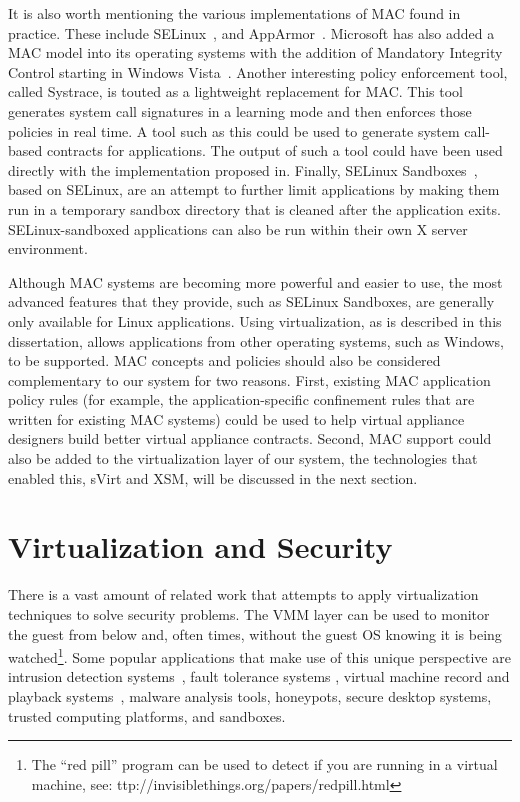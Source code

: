 It is also worth mentioning the various implementations of MAC found in practice. These include SELinux~\cite{smalley_2001, loscocco_2001}, and AppArmor~\cite{AppArmor_2006}. Microsoft has also added a MAC model into its operating systems with the addition of Mandatory Integrity Control starting in Windows Vista~\cite{windows_integrity_mechanism, mandatory_integrity_control}. Another interesting policy enforcement tool, called Systrace\cite{provos_2003}, is touted as a lightweight replacement for MAC. This tool generates system call signatures in a learning mode and then enforces those policies in real time. A tool such as this could be used to generate system call-based contracts for applications. The output of such a tool could have been used directly with the implementation proposed in\cite{evanchik_thesis_2004}. Finally, SELinux Sandboxes~\cite{selinux_sandboxes_walsh_2009, selinux_sandboxes_morris_2009}, based on SELinux, are an attempt to further limit applications by making them run in a temporary sandbox directory that is cleaned after the application exits. SELinux-sandboxed applications can also be run within their own X server environment. 

Although MAC systems are becoming more powerful and easier to use, the most advanced features that they provide, such as SELinux Sandboxes, are generally only available for Linux applications. Using virtualization, as is described in this dissertation, allows applications from other operating systems, such as Windows, to be supported. MAC concepts and policies should also be considered complementary to our system for two reasons. First, existing MAC application policy rules (for example, the application-specific confinement rules that are written for existing MAC systems) could be used to help virtual appliance designers build better virtual appliance contracts. Second, MAC support could also be added to the virtualization layer of our system, the technologies that enabled this, sVirt\cite{sVirt_website} and XSM\cite{xsm_xen_summit_3rd}, will be discussed in the next section.

\section{Virtualization and Security}

There is a vast amount of related work that attempts to apply virtualization techniques to solve security problems. The VMM layer can be used to monitor the guest from below and, often times, without the guest OS knowing it is being watched\footnote{The ``red pill'' program can be used to detect if you are running in a virtual machine, see: ttp://invisiblethings.org/papers/redpill.html}. Some popular applications that make use of this unique perspective are intrusion detection systems~\cite{Panorama_07,VNIDA_08,VMFence_09,Psyco-Virt_07,Protecting_host_detectors_06,HyperSpector05, VMI_IDS_2003}, fault tolerance systems \cite{bressoud_1995}, virtual machine record and playback systems~\cite{dunlap_2002,king_2003}, malware analysis tools\cite{leet09_malware}, honeypots\cite{asrigo_2006}, secure desktop systems\cite{zhao_2005, Meushaw_2000, qubes-os_2010}, trusted computing platforms\cite{garfinkel_2003}, and sandboxes\cite{isolated_execution_2010}.

